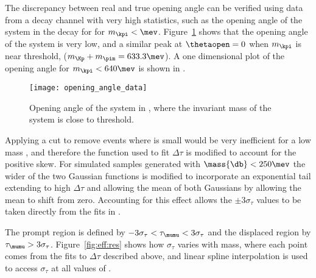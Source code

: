 The discrepancy between real and true opening angle can be verified using data
from a decay channel with very high statistics, such as the opening angle of the \kpi system in
the decay \decay{\Bd}{\kpi\mumu} for for $m_{\kpi}<\mev$.
Figure~\ref{fig:db:openkpi} shows that the opening angle of the \kpi system
is very low, and a similar peak at $\thetaopen=0$ when $m_{\kpi}$ is near threshold,
($m_{\Kp} + m_{\pim} = 633.3\mev$).
A one dimensional plot of the opening angle for $m_{\kpi}<640\mev$ is shown in .

\begin{figure}
  \begin{center}
    \texttt{[image: opening\_angle\_data]}
    \caption[Opening angle of \kpi]
    {
      Opening angle of the \kpi system in \decay{\Bd}{\kpi\mumu}, where the invariant mass of the
      \kpi system is close to threshold.
    }
    \label{fig:db:openkpi}
  \end{center}
\end{figure}

Applying a cut to remove events where \thetaopen is small would be very inefficient for a low mass
\db, and therefore the function used to fit $\Delta\tau$ is modified to account for the positive
skew.
For simulated samples generated with $\mass{\db}<250\mev$ the wider of the two Gaussian functions
is modified to incorporate an exponential tail
extending to high $\Delta\tau$ and allowing the mean of both Gaussians by allowing the mean to
shift from zero.
Accounting for this effect allows the $\pm3\sigma_\tau$ values to be taken directly from the fits
in .

The prompt region is defined by $-3\sigma_\tau<\tau_{\mumu}<3\sigma_\tau$ and the displaced region
by $\tau_{\mumu}>3\sigma_\tau$.
Figure~\ref{fig:eff:res} shows how $\sigma_\tau$ varies with mass, where each point comes from the
fits to $\Delta\tau$ described above, and linear spline interpolation is used to access
$\sigma_\tau$ at all values of .



